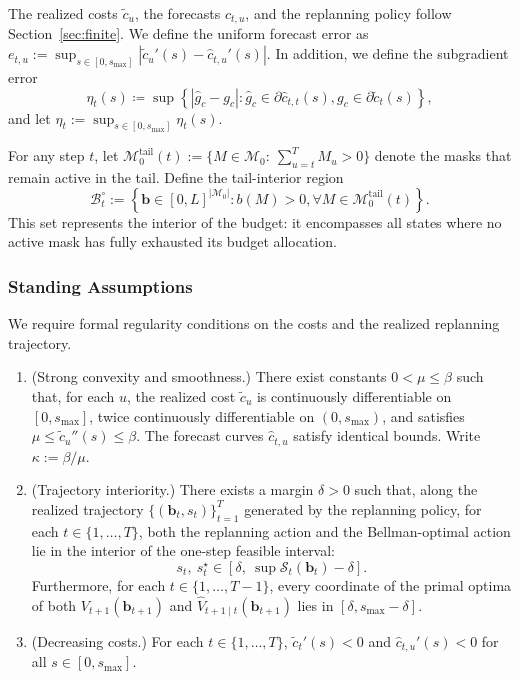 \documentclass{uai2026} %
\newcommand{\1}{\mathbf{1}}
\newcommand{\scalt}{\mathcal{S}_{t}}
\newcommand{\ens}[1]{\left\{#1\right\}}
\newcommand{\mcal}{\mathcal{M}}
\newcommand{\bcal}{\mathcal{B}}
\newenvironment{assumptions}{%
  \begingroup
  \renewcommand{\labelenumi}{\textbf{A\arabic{enumi}}.}%
  \renewcommand{\theenumi}{A\arabic{enumi}}%
  \begin{enumerate}
    }{%
  \end{enumerate}
  \endgroup
}
\begin{document}
The realized costs $\tilde{c}_u$, the forecasts $\hat{c}_{t,u}$, and the replanning policy follow Section~\ref{sec:finite}. We define the uniform forecast error as $e_{t,u} := \sup_{s\in[0,s_{\max}]} |\tilde{c}_u'(s) - \hat{c}_{t,u}'(s)|$. In addition, we define the subgradient error
\begin{equation*}
  \eta_t(s) \coloneqq \sup\ens{|\hat{g}_c-g_c|: \hat{g}_c \in \partial \hat{c}_{t,t}(s),  g_c \in \partial \tilde{c}_t(s)},
\end{equation*}
and let $\eta_t:=\sup_{s\in[0,s_{\max}]}\eta_t(s)$.

For any step $t$, let $\mcal_{0}^{\mathrm{tail}}(t):=\{M\in\mcal_{0}:\ \sum_{u=t}^{T} M_u>0\}$ denote the masks that remain active in the tail.
Define the tail-interior region
\begin{equation*}
  \bcal_{t}^{\circ} := \left\{\mathbf{b}\in[0,L]^{|\mcal_{0}|} : b(M)>0, \forall M\in\mcal_{0}^{\mathrm{tail}}(t) \right\}.
\end{equation*}
This set represents the interior of the budget: it encompasses all states where no active mask has fully exhausted its budget allocation.

\subsubsection{Standing Assumptions}

We require formal regularity conditions on the costs and the realized replanning trajectory.

\begin{assumptions}
\item\label{ass:A1} (Strong convexity and smoothness.) There exist constants $0 < \mu \le \beta$ such that, for each $u$, the realized cost $\tilde{c}_u$ is continuously differentiable on $[0,s_{\max}]$, twice continuously differentiable on $(0,s_{\max})$, and satisfies $\mu \le \tilde{c}_u''(s) \le \beta$. The forecast curves $\hat{c}_{t,u}$ satisfy identical bounds. Write $\kappa := \beta/\mu$.
\item\label{ass:A2} (Trajectory interiority.)
  There exists a margin $\delta > 0$ such that, along the realized trajectory $\{(\mathbf{b}_t,s_t)\}_{t=1}^{T}$ generated by the replanning policy, for each $t \in \{1,\dots,T\}$, both the replanning action and the Bellman-optimal action lie in the interior of the one-step feasible interval:
  \begin{equation*}
    s_t,\ s_t^{\star}
    \in
    [\delta,\ \sup\scalt(\mathbf{b}_t)-\delta].
  \end{equation*}
  Furthermore, for each $t \in \{1,\dots,T-1\}$, every coordinate of the primal optima of both $V_{t+1}(\mathbf{b}_{t+1})$ and $\hat{V}_{t+1\mid t}(\mathbf{b}_{t+1})$ lies in $[\delta, s_{\max} - \delta]$.
\item\label{ass:A3} (Decreasing costs.)
  For each $t \in \{1,\dots,T\}$, $\tilde{c}_t'(s) < 0$ and $\hat{c}_{t,u}'(s) < 0$ for all $s \in [0,s_{\max}]$.
\end{assumptions}
\end{document}
